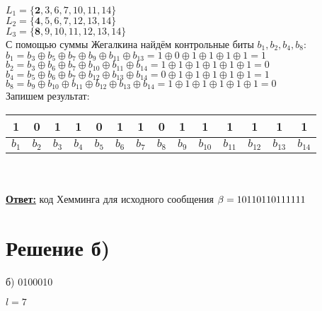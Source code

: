 $ L_1 = \{\textbf{2}, 3, 6, 7, 10, 11, 14\} $\\

$ L_2 = \{\textbf{4}, 5, 6, 7, 12, 13, 14\} $\\

$ L_3 = \{\textbf{8}, 9, 10, 11, 12, 13, 14\}$\\

С помощью суммы Жегалкина найдём контрольные биты $ b_1, b_2, b_4, b_8 $:\\

$ b_1 = b_3 \oplus b_5 \oplus b_7 \oplus b_9 \oplus b_{11} \oplus b_{13} = 
1 \oplus 0 \oplus 1 \oplus 1 \oplus 1 \oplus 1 = 1 $\\

$ b_2 = b_3 \oplus b_6 \oplus b_7 \oplus b_{10} \oplus b_{11} \oplus b_{14} = 
1 \oplus 1 \oplus 1 \oplus 1 \oplus 1 \oplus 1 = 0 $\\

$ b_4 = b_5 \oplus b_6 \oplus b_7 \oplus b_{12} \oplus b_{13} \oplus b_{14} = 
0 \oplus 1 \oplus 1 \oplus 1 \oplus 1 \oplus 1 = 1 $\\

$ b_8 = b_9 \oplus b_{10} \oplus b_{11} \oplus b_{12} \oplus b_{13} \oplus b_{14} = 
1 \oplus 1 \oplus 1 \oplus 1 \oplus 1 \oplus 1 = 0$\\

Запишем результат:

\begin{tabular}{|c|c|c|c|c|c|c|c|c|c|c|c|c|c|}
    \hline
    \textbf{1} & \textbf{0} & 1 & \textbf{1} & 0 & 1 & 1 & \textbf{0} & 1 & 1 & 1 & 1 & 1 & 1 \\
    \hline
    $ b_{1} $ & $ b_{2} $ & $ b_{3} $ & $ b_{4} $ & $ b_{5} $ & $ b_{6} $ & $ b_{7} $ & $ b_{8} $ & $ b_{9} $ & $ b_{10} $ & $ b_{11} $ & $ b_{12} $ & $ b_{13} $ & $ b_{14} $\\
    \hline
\end{tabular}
\\
\\

\textbf{\underline{Ответ:}} 
код Хемминга для исходного сообщения $ \beta =  10110110111111 \\ $


\section*{Решение б)}

б) 0100010

$ l = 7 $\\

